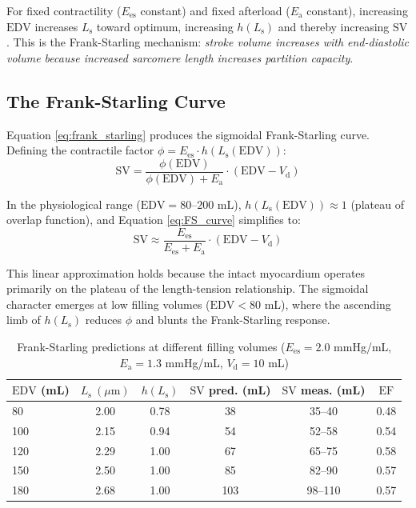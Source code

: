 \documentclass[12pt,a4paper]{article}
\theoremstyle{remark}
\newcommand{\Ees}{E_{\mathrm{es}}}
\newcommand{\Ea}{E_{\mathrm{a}}}
\newcommand{\Vd}{V_{\mathrm{d}}}
\newcommand{\SV}{\mathrm{SV}}
\newcommand{\EDV}{\mathrm{EDV}}
\newcommand{\EF}{\mathrm{EF}}
\newcommand{\Ls}{L_{\mathrm{s}}}
\begin{document}
For fixed contractility ($\Ees$ constant) and fixed afterload ($\Ea$ constant), increasing $\EDV$ increases $\Ls$ toward optimum, increasing $h(\Ls)$ and thereby increasing $\SV$. This is the Frank-Starling mechanism: \textit{stroke volume increases with end-diastolic volume because increased sarcomere length increases partition capacity}.

\subsection{The Frank-Starling Curve}

Equation \ref{eq:frank_starling} produces the sigmoidal Frank-Starling curve. Defining the contractile factor $\phi = \Ees \cdot h(\Ls(\EDV))$:
\begin{equation}
    \SV = \frac{\phi(\EDV)}{\phi(\EDV) + \Ea} \cdot (\EDV - \Vd)
    \label{eq:FS_curve}
\end{equation}

In the physiological range ($\EDV = 80$--$200$ mL), $h(\Ls(\EDV)) \approx 1$ (plateau of overlap function), and Equation \ref{eq:FS_curve} simplifies to:
\begin{equation}
    \SV \approx \frac{\Ees}{\Ees + \Ea} \cdot (\EDV - \Vd)
    \label{eq:FS_simple}
\end{equation}

This linear approximation holds because the intact myocardium operates primarily on the plateau of the length-tension relationship. The sigmoidal character emerges at low filling volumes ($\EDV < 80$ mL), where the ascending limb of $h(\Ls)$ reduces $\phi$ and blunts the Frank-Starling response.

\begin{table}[h]
\centering
\caption{Frank-Starling predictions at different filling volumes ($\Ees = 2.0$ mmHg/mL, $\Ea = 1.3$ mmHg/mL, $\Vd = 10$ mL)}
\label{tab:frank_starling}
\begin{tabular}{lccccc}
\toprule
$\EDV$ (mL) & $\Ls~(\mu\mathrm{m})$ & $h(\Ls)$ & $\SV$ pred. (mL) & $\SV$ meas. (mL) & $\EF$ \\
\midrule
80 & 2.00 & 0.78 & 38 & 35--40 & 0.48 \\
100 & 2.15 & 0.94 & 54 & 52--58 & 0.54 \\
120 & 2.29 & 1.00 & 67 & 65--75 & 0.58 \\
150 & 2.50 & 1.00 & 85 & 82--90 & 0.57 \\
180 & 2.68 & 1.00 & 103 & 98--110 & 0.57 \\
\bottomrule
\end{tabular}
\end{table}
\end{document}
